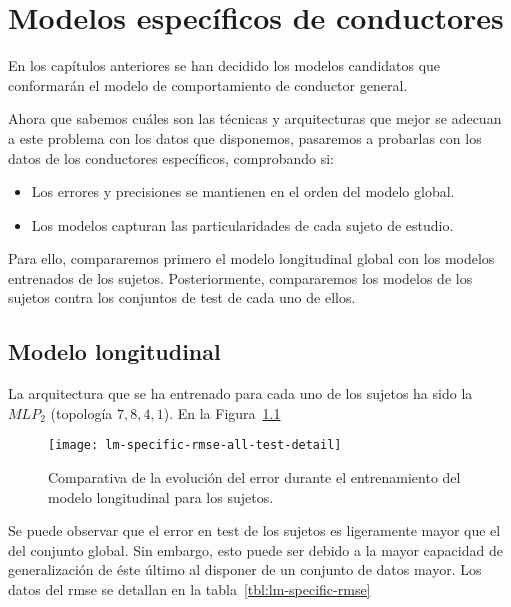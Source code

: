 \chapter{Modelos específicos de conductores}
\label{ch:specific-models}

En los capítulos anteriores se han decidido los modelos candidatos que conformarán el modelo de comportamiento de conductor general.

Ahora que sabemos cuáles son las técnicas y arquitecturas que mejor se adecuan a este problema con los datos que disponemos, pasaremos a probarlas con los datos de los conductores específicos, comprobando si:

\begin{itemize}
	\item Los errores y precisiones se mantienen en el orden del modelo global.
	\item Los modelos capturan las particularidades de cada sujeto de estudio.
\end{itemize}

Para ello, compararemos primero el modelo longitudinal global con los modelos entrenados de los sujetos. Posteriormente, compararemos los modelos de los sujetos contra los conjuntos de test de cada uno de ellos.

\section{Modelo longitudinal}

La arquitectura que se ha entrenado para cada uno de los sujetos ha sido la $MLP_2$ (topología $7, 8, 4, 1$). En la Figura~\ref{fig:lm-specific-training-validation-and-test-comparison} 

\begin{figure}
	\centering
	\texttt{[image: lm-specific-rmse-all-test-detail]}
	\caption[Comparativa de la evolución del error de test entre los sujetos de la arquitectura seleccionada para el modelo longitudinal]{Comparativa de la evolución del error durante el entrenamiento del modelo longitudinal para los sujetos.}
	\label{fig:lm-specific-training-validation-and-test-comparison}
\end{figure}

Se puede observar que el error en test de los sujetos es ligeramente mayor que el del conjunto global. Sin embargo, esto puede ser debido a la mayor capacidad de generalización de éste último al disponer de un conjunto de datos mayor. Los datos del \ac{rmse} se detallan en la tabla~\ref{tbl:lm-specific-rmse}

